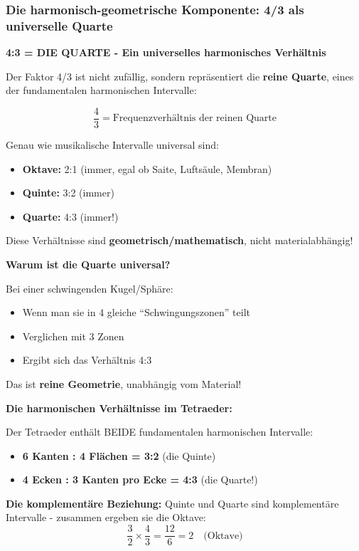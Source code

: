 \subsubsection{Die harmonisch-geometrische Komponente: 4/3 als universelle Quarte}

\textbf{4:3 = DIE QUARTE - Ein universelles harmonisches Verhältnis}

Der Faktor 4/3 ist nicht zufällig, sondern repräsentiert die \textbf{reine Quarte}, eines der fundamentalen harmonischen Intervalle:

\begin{equation}
	\frac{4}{3} = \text{Frequenzverhältnis der reinen Quarte}
\end{equation}

Genau wie musikalische Intervalle universal sind:
\begin{itemize}
	\item \textbf{Oktave:} 2:1 (immer, egal ob Saite, Luftsäule, Membran)
	\item \textbf{Quinte:} 3:2 (immer)
	\item \textbf{Quarte:} 4:3 (immer!)
\end{itemize}

Diese Verhältnisse sind \textbf{geometrisch/mathematisch}, nicht materialabhängig!

\textbf{Warum ist die Quarte universal?}

Bei einer schwingenden Kugel/Sphäre:
\begin{itemize}
	\item Wenn man sie in 4 gleiche ``Schwingungszonen'' teilt
	\item Verglichen mit 3 Zonen
	\item Ergibt sich das Verhältnis 4:3
\end{itemize}

Das ist \textbf{reine Geometrie}, unabhängig vom Material!

\textbf{Die harmonischen Verhältnisse im Tetraeder:}

Der Tetraeder enthält BEIDE fundamentalen harmonischen Intervalle:
\begin{itemize}
	\item \textbf{6 Kanten : 4 Flächen = 3:2} (die Quinte)
	\item \textbf{4 Ecken : 3 Kanten pro Ecke = 4:3} (die Quarte!)
\end{itemize}

\textbf{Die komplementäre Beziehung:}
Quinte und Quarte sind komplementäre Intervalle - zusammen ergeben sie die Oktave:
\begin{equation}
	\frac{3}{2} \times \frac{4}{3} = \frac{12}{6} = 2 \quad \text{(Oktave)}
\end{equation}


